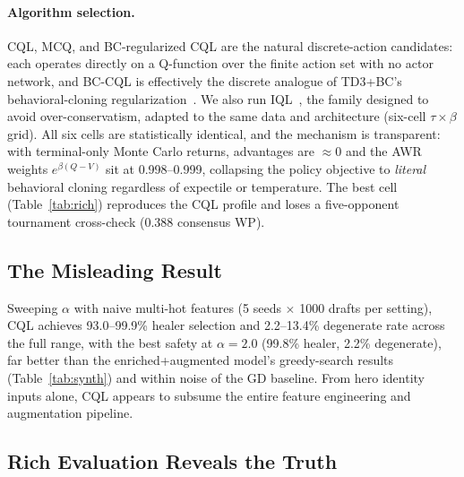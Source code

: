 \documentclass[journal]{IEEEtran}
\begin{document}
\paragraph{Algorithm selection.} CQL, MCQ, and BC-regularized CQL are the natural discrete-action candidates: each operates directly on a Q-function over the finite action set with no actor network, and BC-CQL is effectively the discrete analogue of TD3+BC's behavioral-cloning regularization~\cite{fujimoto2021minimalist}. We also run IQL~\cite{kostrikov2022iql}, the family designed to avoid over-conservatism, adapted to the same data and architecture (six-cell $\tau \times \beta$ grid). All six cells are statistically identical, and the mechanism is transparent: with terminal-only Monte Carlo returns, advantages are $\approx 0$ and the AWR weights $e^{\beta(Q - V)}$ sit at 0.998--0.999, collapsing the policy objective to \textit{literal} behavioral cloning regardless of expectile or temperature. The best cell (Table~\ref{tab:rich}) reproduces the CQL profile and loses a five-opponent tournament cross-check (0.388 consensus WP).

\subsection{The Misleading Result}

Sweeping $\alpha$ with naive multi-hot features (5 seeds $\times$ 1000 drafts per setting), CQL achieves 93.0--99.9\% healer selection and 2.2--13.4\% degenerate rate across the full range, with the best safety at $\alpha = 2.0$ (99.8\% healer, 2.2\% degenerate), far better than the enriched+augmented model's greedy-search results (Table~\ref{tab:synth}) and within noise of the GD baseline. From hero identity inputs alone, CQL appears to subsume the entire feature engineering and augmentation pipeline.

\subsection{Rich Evaluation Reveals the Truth}
\end{document}
